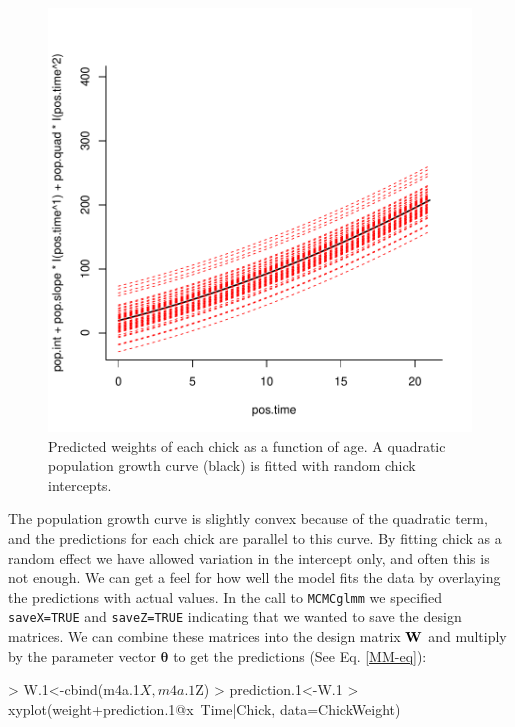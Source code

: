 \documentclass{article}
\begin{document}
\begin{figure}[!h]
\begin{center}
\includegraphics{Lecture4-011}
\end{center}
\caption{Predicted weights of each chick as a function of age. A quadratic population growth curve (black) is fitted with random chick intercepts.}
\label{CWpred.1-fig}
\end{figure}

The population growth curve is slightly convex because of the quadratic term, and the predictions for each chick are parallel to this curve. By fitting chick as a random effect we have allowed variation in the intercept only, and often this is not enough. We can get a feel for how well the model fits the data by overlaying the predictions with actual values. In the call to \texttt{MCMCglmm} we specified \texttt{saveX=TRUE} and \texttt{saveZ=TRUE} indicating that we wanted to save the design matrices. We can combine these matrices into the design matrix ${\bf W}$ and multiply by the parameter vector ${\bm \theta}$ to get the predictions (See Eq. \ref{MM-eq}):

\begin{Schunk}
\begin{Sinput}
> W.1<-cbind(m4a.1$X, m4a.1$Z)  
> prediction.1<-W.1%
> xyplot(weight+prediction.1@x~Time|Chick, data=ChickWeight)
\end{Sinput}
\end{Schunk}
\end{document}
